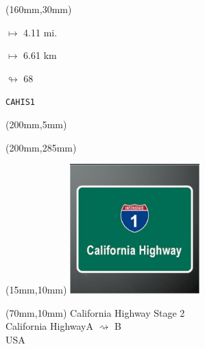 \begin{textblock*}{40mm}(160mm,30mm)%
\Large
\par$\mapsto$ 4.11 mi.
\par$\mapsto$ 6.61 km
\par$\looparrowright$ 68
\par\hfill\tiny\tt CAHIS1\\
\end{textblock*}
\begin{textblock*}{20mm}(200mm,5mm)%
\fbox{\thepage}
\label{CAHIS1}
\end{textblock*}
\begin{textblock*}{20mm}(200mm,285mm)%
\fbox{\thepage}
\end{textblock*}

\null\newpage
\begin{textblock*}{50mm}(15mm,10mm)%
\includegraphics[width=50mm]{LG/2015-05-20_00077.png}
\end{textblock*}
\begin{textblock*}{130mm}(70mm,10mm)%
{\fontsize{20}{20}\selectfont California Highway Stage 2\\}
{\fontsize{16}{16}\selectfont California Highway\hfill A $\rightsquigarrow$ B\\}
{\fontsize{12}{12}\selectfont USA\\}
\end{textblock*}
